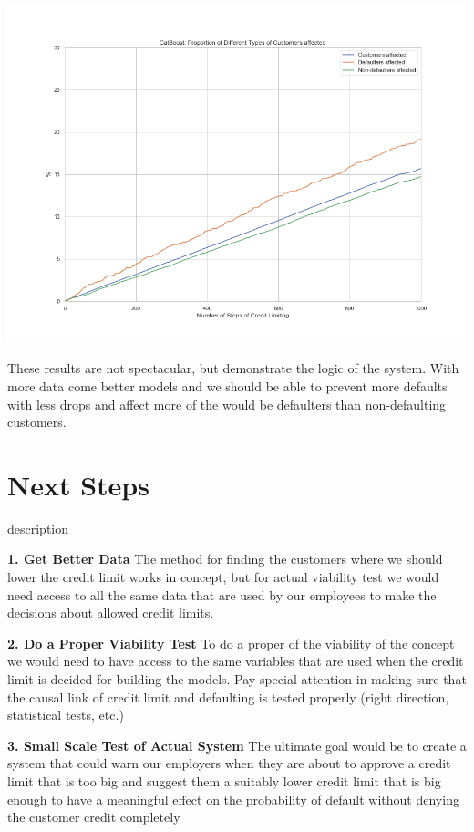 \documentclass[12pt,a4paper,leqno]{report}
\theoremstyle{plain}
\theoremstyle{definition}
\theoremstyle{remark}
\begin{document}
\bigskip
{
    \centering
    \includegraphics[width=\textwidth,height=\textheight,keepaspectratio]{catboost_types_of_customers_affected.png}
    \par
}
\bigskip

These results are not spectacular, but demonstrate the logic of the system.
With more data come better models and we should be able to prevent more
defaults with less drops and affect more of the would be defaulters than
non-defaulting customers.

\section{Next Steps}

\begin{labeling}{description}
\item [\textbf{1. Get Better Data}]
    The method for finding the customers where
    we should lower the credit limit
    works in concept, but for actual viability test we would need access to all
    the same data that are used by our employees to make the decisions about allowed
    credit limits.
\item [\textbf{2. Do a Proper Viability Test}] To do a proper of the viability of the
    concept we would need to have access to the same variables that are used when the
    credit limit is decided for building the models. Pay special attention in making
    sure that the causal link of credit limit and defaulting is tested properly
    (right direction, statistical tests, etc.)
\item [\textbf{3. Small Scale Test of Actual System}] The ultimate goal would be to
    create a system that could warn our employers when they are about to approve a credit
    limit that is too big and suggest them a suitably lower credit limit that is big
    enough to have a meaningful effect on the probability of default without denying
    the customer credit completely
\end{labeling}
\end{document}

